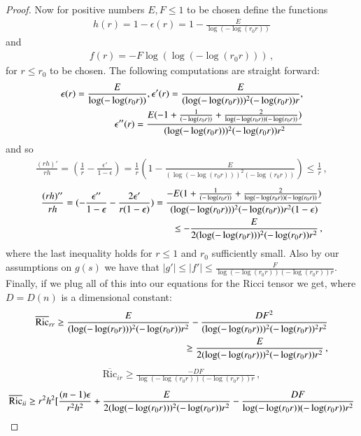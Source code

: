 \documentclass[11pt]{article}
\newcommand{\Ric}{\text{Ric}}
\begin{document}
\begin{proof}
Now for positive numbers $E,F\leq 1$ to be chosen define the functions
\begin{align}
 h(r)=1-\epsilon(r)=1-\frac{E}{\log(-\log(r_0r))}
\end{align}
and
\begin{align}
f(r)=-F\log(\log(-\log(r_0r)))\, ,
\end{align}
for $r\leq r_0$ to be chosen.  The following computations are straight forward:
\begin{align}
 \epsilon(r)=\frac{E}{\log(-\log (r_0r))}, \epsilon'(r)=\frac{E}{(\log(-\log (r_0r)))^{2}(-\log (r_0r))r},\notag
\\
\epsilon''(r)=\frac{E(-1+\frac{1}{(-\log (r_0r))}+\frac{2}{\log (-\log (r_0r))(-\log (r_0r))})} {(\log (-\log (r_0r)))^{2}(-\log (r_0r))r^{2}}
\end{align}
and so
\begin{align}
 \frac{(rh)'}{rh}=(\frac{1}{r}-\frac{\epsilon'}{1-\epsilon}) = \frac{1}{r}(1-\frac{E}{(\log (-\log (r_0r)))^{2}(-\log (r_0r))})\leq \frac{1}{r}\, ,
\end{align}
\begin{align}
 \frac{(rh)''}{rh} = (-\frac{\epsilon''}{1-\epsilon} - \frac{2\epsilon'}{r(1-\epsilon)}) = \frac{-E(1+\frac{1}{(-\log (r_0r))}+\frac{2}{\log (-\log (r_0r))(-\log (r_0r))})} {(\log (-\log (r_0r)))^{2}(-\log (r_0r))r^{2}(1-\epsilon)} \notag\\
\leq -\frac{E}{2(\log (-\log (r_0r)))^{2}(-\log (r_0r))r^{2}}\, ,
\end{align}
where the last inequality holds for $r\leq 1$ and $r_0$ sufficiently small.  Also by our assumptions on $g(s)$ we have that $|g'|\leq |f'|\leq \frac{F}{\log (-\log (r_0r))(-\log (r_0r))r}$.  Finally, if we plug all of this into our equations for the Ricci tensor we get, where $D=D(n)$ is a dimensional constant:
\begin{align}\label{e:Rc1}
\overline{\Ric}_{rr}\geq \frac{E}{(\log (-\log (r_0r)))^{2}(-\log (r_0r))r^{2}}- \frac{DF^{2}}{(\log (-\log (r_0r)))^{2}(-\log (r_0r))^{2}r^{2}} \notag
\\
\geq \frac{E}{2(\log (-\log(r_0r)))^{2}(-\log (r_0r))r^{2}}\, ,
\end{align}
\begin{align}\label{e:Rc2}
\overline{\Ric}_{ir}\geq \frac{-DF}{\log (-\log(r_0r))(-\log (r_0r))r}\, ,
\end{align}
\begin{align}\label{e:Rc3}
\overline{\Ric}_{ii}\geq r^{2}h^{2}[\frac{(n-1)\epsilon}{r^{2}h^{2}} + \frac{E}{2(\log (-\log (r_0r)))^{2}(-\log (r_0r))r^{2}} - \frac{DF}{\log (-\log (r_0r))(-\log (r_0r))r^{2}}\notag\\

\end{align}
\end{proof}
\end{document}
